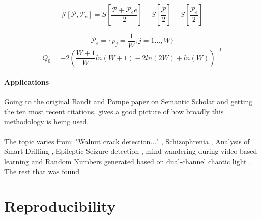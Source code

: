 $$\mathscr{J}[\mathscr{P},\mathscr{P}_e]=S[\frac{\mathscr{P}+\mathscr{P}_ee}{2}]-S[\frac{\mathscr{P}}{2}]-S[\frac{\mathscr{P}_e}{2}]$$

$$\mathscr{P}_e=\{p_j=\frac{1}{W};j=1...,W\}$$
$$Q_0 = -2(\frac{W+1}{W}ln(W+1)-2ln(2W)+ln(W))^{-1}$$
\cite{Amigo2023b}

\paragraph{Applications}
Going to the original Bandt and Pompe paper \cite{Bandt2002} on Semantic Scholar and getting the ten most recent citations, gives a good picture of how broadly this methodology is being used.
\\\\
The topic varies from: "Walnut crack detection..." \cite{Zhang2024}, Schizophrenia \cite{Wang2024}, Analysis of Smart Drilling \cite{Szwajka2024}, Epileptic Seizure detection \cite{AbhishekParikh2024}, mind wandering during video-based learning \cite{Tang2024} and Random Numbers generated based on dual-channel chaotic light \cite{Liu2024}. The rest that was found \cite{Demirel2024, Du2024, Sun2024, Li2024}

\section{Reproducibility}
